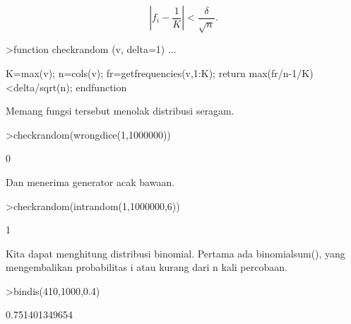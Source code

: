 \documentclass[a4paper,10pt]{article}
\begin{document}
\begin{eulernotebook}
\begin{eulercomment}
\begin{eulercomment}
\begin{eulercomment}
\begin{eulercomment}
\begin{eulercomment}
\begin{eulercomment}
\begin{eulercomment}
\begin{eulercomment}
\begin{eulercomment}
\begin{eulercomment}
\begin{eulercomment}
\begin{eulercomment}
\begin{eulercomment}
\begin{eulercomment}
\begin{eulercomment}
\begin{eulercomment}
\begin{eulercomment}
\begin{eulercomment}
\begin{eulercomment}
\begin{eulercomment}
\begin{eulercomment}
\begin{eulercomment}
\begin{eulercomment}
\begin{eulercomment}
\begin{eulercomment}
\begin{eulercomment}
\begin{eulercomment}
\begin{eulercomment}
\begin{eulercomment}
\begin{eulercomment}
\begin{eulercomment}
\begin{eulercomment}
\begin{eulercomment}
\end{eulercomment}
\begin{eulerformula}
\[
\left|f_i-\frac{1}{K}\right| < \frac{\delta}{\sqrt{n}}.
\]
\end{eulerformula}
\begin{eulerprompt}
>function checkrandom (v, delta=1) ...
\end{eulerprompt}
\begin{eulerudf}
    K=max(v); n=cols(v);
    fr=getfrequencies(v,1:K);
    return max(fr/n-1/K)<delta/sqrt(n);
    endfunction
\end{eulerudf}
\begin{eulercomment}
Memang fungsi tersebut menolak distribusi seragam.
\end{eulercomment}
\begin{eulerprompt}
>checkrandom(wrongdice(1,1000000))
\end{eulerprompt}
\begin{euleroutput}
  0
\end{euleroutput}
\begin{eulercomment}
Dan menerima generator acak bawaan.
\end{eulercomment}
\begin{eulerprompt}
>checkrandom(intrandom(1,1000000,6))
\end{eulerprompt}
\begin{euleroutput}
  1
\end{euleroutput}
\begin{eulercomment}
Kita dapat menghitung distribusi binomial. Pertama ada binomialsum(),
yang mengembalikan probabilitas i atau kurang dari n kali percobaan.
\end{eulercomment}
\begin{eulerprompt}
>bindis(410,1000,0.4)
\end{eulerprompt}
\begin{euleroutput}
  0.751401349654
\end{euleroutput}

\end{eulercomment}
\end{eulercomment}
\end{eulercomment}
\end{eulercomment}
\end{eulercomment}
\end{eulercomment}
\end{eulercomment}
\end{eulercomment}
\end{eulercomment}
\end{eulercomment}
\end{eulercomment}
\end{eulercomment}
\end{eulercomment}
\end{eulercomment}
\end{eulercomment}
\end{eulercomment}
\end{eulercomment}
\end{eulercomment}
\end{eulercomment}
\end{eulercomment}
\end{eulercomment}
\end{eulercomment}
\end{eulercomment}
\end{eulercomment}
\end{eulercomment}
\end{eulercomment}
\end{eulercomment}
\end{eulercomment}
\end{eulercomment}
\end{eulercomment}
\end{eulercomment}
\end{eulercomment}
\end{eulernotebook}
\end{document}
